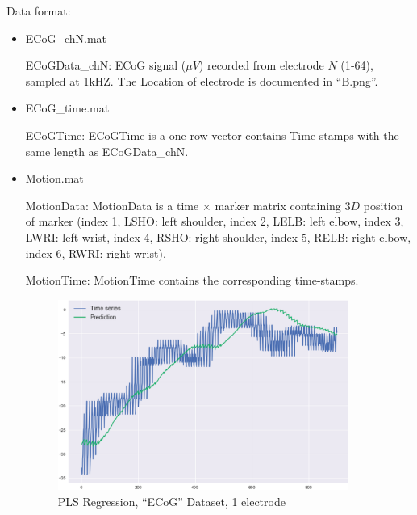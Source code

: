 \documentclass[12pt,twoside]{article}
\begin{document}
	Data format: 
	\begin{itemize}
	\item ECoG\_chN.mat

	ECoGData\_chN: ECoG signal ($\mu V$) recorded from electrode $N$ (1‐64), sampled at 1kHZ.
	The Location of electrode is documented in ``B.png''.

	\item ECoG\_time.mat

	ECoGTime: ECoGTime is a one row-vector contains Time-stamps with the same length as ECoGData\_chN.

	\item Motion.mat

	MotionData: MotionData is a time $\times$ marker matrix containing $3D$ position of marker (index 1, LSHO: left shoulder, index 2, LELB: left elbow, index 3, LWRI: left wrist, index 4, RSHO: right shoulder, index 5, RELB: right elbow, index 6, RWRI: right wrist).

	MotionTime: MotionTime contains the corresponding time-stamps.

	\begin{figure}[!h]
	\center
		\includegraphics[width=0.9\textwidth]{prediction_pls_ecog.eps}
	\caption{PLS Regression, ``ECoG'' Dataset, 1 electrode}
	\end{figure}


	\end{itemize}
\newpage
\nocite{*}
\renewcommand{\bibname}{References}





% 
\end{document}
